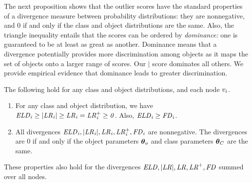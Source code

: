 		
		The next proposition shows that the outlier scores have the standard properties of a divergence measure between probability distributions: they are nonnegative, and 0 if and only if the class and object distributions are the same. Also, the triangle inequality entails that the scores can be ordered by {\em dominance:} one is guaranteed to be at least as great as another. Dominance means that a divergence potentially provides more discrimination among objects as it maps the set of objects onto a larger range of scores. Our $\mid$ score dominates all others.  We provide empirical evidence that dominance leads to greater discrimination.
		
		\begin{proposition} \label{prop:divergence} The following hold for any class and object distributions, and each node $v_{i}$.
			
			\begin{enumerate}
				\item For any class and object distribution, we have $\it{ELD}_{i} \geq |\it{LR}_{i}| \geq \it{LR}_{i} = \it{LR}_{i}^{+} \geq 0$. Also, $\it{ELD}_{i} \geq \it{FD}_{i}$. \label{clause:inequalities}
				\item All divergences $\it{ELD}_{i},|\it{LR}_{i}|,\it{LR}_{i},\it{LR}_{i}^{+},\it{FD}_{i}$ are nonnegative. The divergences are 0 if and only if the object parameters $\boldsymbol{\theta}_{o}$ and class parameters $\boldsymbol{\theta}_{C}$ are the same. \label{clause:nonnegative}
			\end{enumerate}
			These properties also hold for the divergences $\it{ELD},|\it{LR}|,\it{LR},\it{LR}^{+},\it{FD}$ summed over all nodes.
		\end{proposition}
